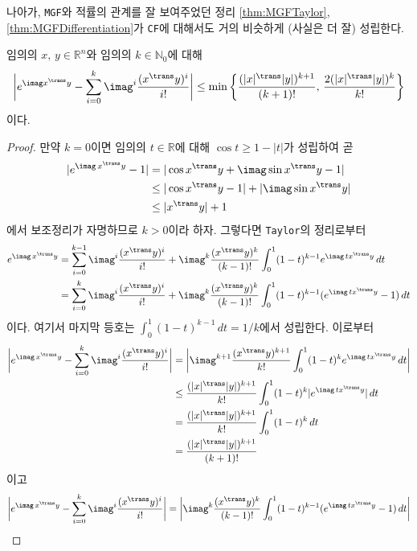 나아가, \texttt{MGF}와 적률의 관계를 잘 보여주었던 정리 \ref{thm:MGFTaylor}, \ref{thm:MGFDifferentiation}가 \texttt{CF}에 대해서도 거의 비슷하게 (사실은 더 잘) 성립한다.

\begin{lemma}\label{lem:expComplex}
    임의의 $x,\,y\in\mathbb{R}^n$와 임의의 $k\in\mathbb{N}_0$에 대해
    \begin{equation*}
        \bigg|e^{\imag x^\trans y}-\sum_{i=0}^k\imag^i\frac{(x^\trans y)^i}{i!}\bigg|\leq\min\bigg\{\frac{(|x|^\trans|y|)^{k+1}}{(k+1)!},\,\frac{2(|x|^\trans|y|)^k}{k!}\bigg\}
    \end{equation*}
    이다.
\end{lemma}

\begin{proof}
    만약 $k=0$이면 임의의 $t\in\mathbb{R}$에 대해 $\cos t\geq 1-|t|$가 성립하여 곧
    \begin{align*}
        |e^{\imag\,x^\trans y}-1|&=|\cos x^\trans y+\imag\sin x^\trans y-1|\\
        &\leq|\cos x^\trans y-1|+|\imag\sin x^\trans y|\\
        &\leq|x^\trans y|+1
    \end{align*}
    에서 보조정리가 자명하므로 $k>0$이라 하자. 그렇다면 \texttt{Taylor}의 정리로부터
    \begin{align*}
        e^{\imag\,x^\trans y}&=\sum_{i=0}^{k-1}\imag^i\frac{(x^\trans y)^i}{i!}+\imag^k\frac{(x^\trans y)^k}{(k-1)!}\int_0^1(1-t)^{k-1}e^{\imag\,tx^\trans y}\,dt\\
        &=\sum_{i=0}^k\imag^i\frac{(x^\trans y)^i}{i!}+\imag^k\frac{(x^\trans y)^k}{(k-1)!}\int_0^1(1-t)^{k-1}(e^{\imag\,tx^\trans y}-1)\,dt
    \end{align*}
    이다. 여기서 마지막 등호는 $\int_0^1(1-t)^{k-1}\,dt=1/k$에서 성립한다. 이로부터
    \begin{align*}
        \bigg|e^{\imag\,x^\trans y}-\sum_{i=0}^k\imag^i\frac{(x^\trans y)^i}{i!}\bigg|&=\bigg|\imag^{k+1}\frac{(x^\trans y)^{k+1}}{k!}\int_0^1(1-t)^ke^{\imag\,tx^\trans y}\,dt\bigg|\\
        &\leq\frac{(|x|^\trans|y|)^{k+1}}{k!}\int_0^1(1-t)^k|e^{\imag\,tx^\trans y}|\,dt\\
        &=\frac{(|x|^\trans|y|)^{k+1}}{k!}\int_0^1(1-t)^k\,dt\\
        &=\frac{(|x|^\trans|y|)^{k+1}}{(k+1)!}
    \end{align*}
    이고
    \begin{align*}
        \bigg|e^{\imag\,x^\trans y}-\sum_{i=0}^k\imag^i\frac{(x^\trans y)^i}{i!}\bigg|&=\bigg|\imag^k\frac{(x^\trans y)^k}{(k-1)!}\int_0^1(1-t)^{k-1}(e^{\imag\,tx^\trans y}-1)\,dt\bigg|\\

\end{align*}
\end{proof}
